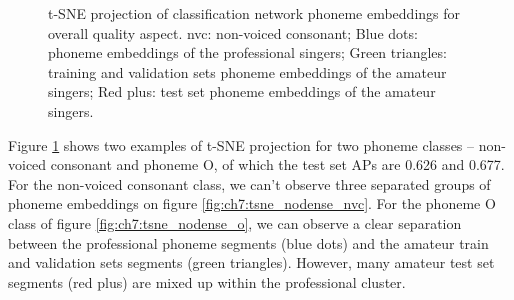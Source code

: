 \begin{figure}
    \centering
    \caption[]{t-SNE projection of classification network phoneme embeddings for overall quality aspect. nvc: non-voiced consonant; Blue dots: phoneme embeddings of the professional singers; Green triangles: training and validation sets phoneme embeddings of the amateur singers; Red plus: test set phoneme embeddings of the amateur singers.}
    \label{fig:ch7:tsne_nodense}
\end{figure}
    
Figure \ref{fig:ch7:tsne_nodense} shows two examples of t-SNE projection for two phoneme classes -- non-voiced consonant and phoneme O, of which the test set APs are 0.626 and 0.677. For the non-voiced consonant class, we can't observe three separated groups of phoneme embeddings on figure \ref{fig:ch7:tsne_nodense_nvc}. For the phoneme O class of figure \ref{fig:ch7:tsne_nodense_o}, we can observe a clear separation between the professional phoneme segments (blue dots) and the amateur train and validation sets segments (green triangles). However, many amateur test set segments (red plus) are mixed up within the professional cluster. 

